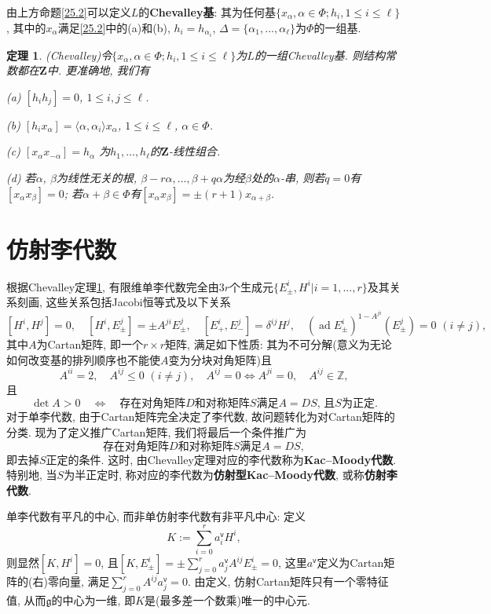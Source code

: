 \documentclass{ctexart}%
\newtheorem{theorem}{定理}
\theoremstyle{definition}
\theoremstyle{remark}
\DeclareMathOperator{\ad}{ad}
\begin{document}
由上方命题\ref{25.2}可以定义$L$的\textbf{Chevalley基}: 其为任何基$\{x_\alpha,\alpha\in\Phi; h_i,1\leq i\leq \ell\}$, 其中的$x_\alpha$满足\ref{25.2}中的(a)和(b), $h_i=h_{\alpha_i}$, $\Delta=\{\alpha_1,...,\alpha_\ell\}$为$\Phi$的一组基. 

\begin{theorem}\label{Chevalley}(Chevalley)令$\{x_\alpha,\alpha\in \Phi;h_i,1\leq i\leq \ell\}$为$L$的一组Chevalley基. 则结构常数都在$\mathbf{Z}$中. 更准确地, 我们有

(a) $[h_ih_j]=0$, $1\leq i,j\leq \ell$.

(b) $[h_ix_\alpha] = \langle \alpha,\alpha_i \rangle x_\alpha$, $1\leq i\leq \ell$, $\alpha\in\Phi$.

(c) $[x_\alpha x_{-\alpha}] = h_\alpha$ 为$h_1,...,h_\ell$的$\mathbf{Z}$-线性组合.

(d) 若$\alpha$, $\beta$为线性无关的根, $\beta-r\alpha,...,\beta+q\alpha$为经$\beta$处的$\alpha$-串, 则若$q=0$有$[x_\alpha x_\beta]=0$; 若$\alpha+\beta\in\Phi$有$[x_\alpha x_\beta]=\pm (r+1) x_{\alpha+\beta}$.
\end{theorem}

\section{仿射李代数}

根据Chevalley定理\ref{Chevalley}, 有限维单李代数完全由$3r$个生成元$\{E^i_\pm,H^i|i=1,...,r\}$及其关系刻画, 这些关系包括Jacobi恒等式及以下关系
$$[H^i,H^j]=0,\quad
[H^i,E^j_\pm] = \pm A^{ji} E^j_\pm,\quad[E^i_+,E^j_-] = \delta^{ij}H^j,\quad
(\ad E^i_\pm)^{1-A^{ji}}(E^j_\pm) =0\,\,(i\neq j),$$
其中$A$为Cartan矩阵, 即一个$r\times r$矩阵, 满足如下性质: 其为不可分解(意义为无论如何改变基的排列顺序也不能使$A$变为分块对角矩阵)且
$$A^{ii}=2,\quad A^{ij}\leq 0\,\,(i\neq j),\quad A^{ij}=0\Leftrightarrow A^{ji}=0,\quad A^{ij}\in \mathbb{Z},$$
且
$$\det A>0\quad \Leftrightarrow \quad\text{存在对角矩阵$D$和对称矩阵$S$满足$A=DS$, 且$S$为正定}.$$
对于单李代数, 由于Cartan矩阵完全决定了李代数, 故问题转化为对Cartan矩阵的分类. 现为了定义推广Cartan矩阵, 我们将最后一个条件推广为
$$\text{存在对角矩阵$D$和对称矩阵$S$满足$A=DS,$}$$
即去掉$S$正定的条件. 这时, 由Chevalley定理对应的李代数称为\textbf{Kac--Moody代数}. 特别地, 当$S$为半正定时, 称对应的李代数为\textbf{仿射型Kac--Moody代数}, 或称\textbf{仿射李代数}.

单李代数有平凡的中心, 而非单仿射李代数有非平凡中心: 定义
$$K:= \sum_{i=0}^r a^{\mathsf{v}}_i H^i,$$
则显然$[K,H^i]=0$, 且$[K,E^i_\pm] = \pm \sum_{j=0}^r a^{\mathsf{v}}_j A^{ij} E^i_\pm =0$, 这里$a^{\mathsf{v}}$定义为Cartan矩阵的(右)零向量, 满足$\sum_{j=0}^r A^{ij} a^{\mathsf{v}}_j=0$. 由定义, 仿射Cartan矩阵只有一个零特征值, 从而$\mathfrak{g}$的中心为一维, 即$K$是(最多差一个数乘)唯一的中心元. 
\end{document}
